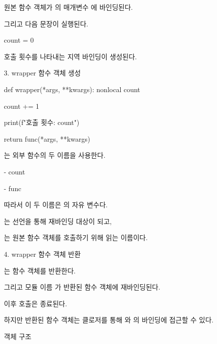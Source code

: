 원본 함수 객체가 의 매개변수 에 바인딩된다.

그리고 다음 문장이 실행된다.

\begin{dhkcode}
count = 0
\end{dhkcode}

호출 횟수를 나타내는 지역 바인딩이 생성된다.

\begin{dhknote}
\begin{dhksmry}[centered]
3. wrapper 함수 객체 생성
\end{dhksmry}
\end{dhknote}

\begin{dhkcode}
def wrapper(*args, **kwargs):
    nonlocal count

    count += 1

    print(f"호출 횟수: {count}")

    return func(*args, **kwargs)
\end{dhkcode}

는 외부 함수의 두 이름을 사용한다.

\begin{dhksmry}
    - count

    - func
\end{dhksmry}

따라서 이 두 이름은 의 자유 변수다.

는  선언을 통해 재바인딩 대상이 되고,

는 원본 함수 객체를 호출하기 위해 읽는 이름이다.

\begin{dhknote}
\begin{dhksmry}[centered]
4. wrapper 함수 객체 반환
\end{dhksmry}
\end{dhknote}

는  함수 객체를 반환한다.

그리고 모듈 이름 가 반환된 함수 객체에 재바인딩된다.

이후  호출은 종료된다.

하지만 반환된  함수 객체는 클로저를 통해 와 의 바인딩에 접근할 수 있다.

\begin{dhknote}
\begin{dhksmry}[centered]
객체 구조
\end{dhksmry}
\end{dhknote}

